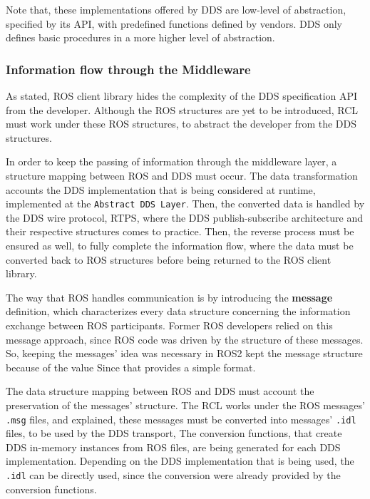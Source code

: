 Note that, these implementations offered by DDS are low-level of abstraction, specified by its API, with predefined functions defined by vendors. DDS only defines basic procedures in a more higher level of abstraction.


\subsubsection{Information flow through the Middleware}

As stated, ROS client library hides the complexity of the DDS specification API from the developer. Although the ROS structures are yet to be introduced, RCL must work under these ROS structures, to abstract the developer from the DDS structures. 
                    
In order to keep the passing of information through the middleware layer, a structure mapping between ROS and DDS must occur. The data transformation accounts the DDS implementation that is being considered at runtime, implemented at the \texttt{Abstract DDS Layer}. Then, the converted data is handled by the DDS wire protocol, RTPS, where the DDS publish-subscribe architecture and their respective structures comes to practice. Then, the reverse process must be ensured as well, to fully complete the information flow, where the data must be converted back to ROS structures before being returned to the ROS client library.
                    
The way that ROS handles communication is by introducing the \textbf{message} definition, which characterizes every data structure concerning the information exchange between ROS participants. Former ROS developers relied on this message approach, since ROS code was driven by the structure of these messages. So, keeping the messages' idea was necessary in ROS2 kept the message structure because of the value  Since that provides a simple format.  

The data structure mapping between ROS and DDS must account the preservation of the messages' structure. The RCL works under the ROS messages' \texttt{.msg} files, and explained, these messages must be converted into messages' \texttt{.idl} files, to be used by the DDS transport, The conversion functions, that create DDS in-memory instances from ROS files, are being generated for each DDS implementation. Depending on the DDS implementation that is being used, the \texttt{.idl} can be directly used, since the conversion were already provided by the conversion functions.
    
